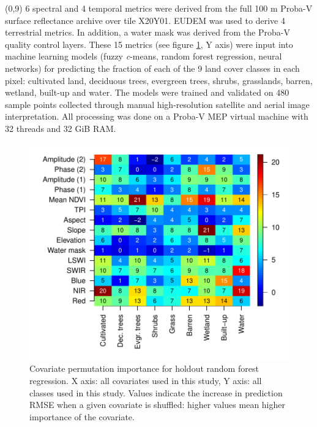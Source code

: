 \documentclass[20pt]{beamer}
\begin{document}
\begin{frame}{}
	\begin{textblock}{7}(0,9)
	  \Line 
	  6 spectral and 4 temporal metrics were derived from the full 100 m Proba-V surface reflectance archive over tile X20Y01. EUDEM was used to derive 4 terrestrial metrics. In addition, a water mask was derived from the Proba-V quality control layers. These 15 metrics (see figure \ref{fig-varimp}, Y axis) were input into machine learning models (fuzzy \textit{c}-means, random forest regression, neural networks) for predicting the fraction of each of the 9 land cover classes in each pixel: cultivated land, deciduous trees, evergreen trees, shrubs, grasslands, barren, wetland, built-up and water. The models were trained and validated on 480 sample points collected through manual high-resolution satellite and aerial image interpretation. All processing was done on a Proba-V MEP virtual machine with 32 threads and 32 GiB RAM.
	  
	  \begin{figure}
			\includegraphics[width=7\TPHorizModule]{../thesis/thesis-figures/variable-importance}
			\caption{Covariate permutation importance for holdout random forest regression. X axis: all covariates used in this study, Y axis: all classes used in this study. Values indicate the increase in prediction RMSE when a given covariate is shuffled: higher values mean higher importance of the covariate.}
			\label{fig-varimp}
      \end{figure}
	
	\end{textblock}
	

\end{frame}
\end{document}
